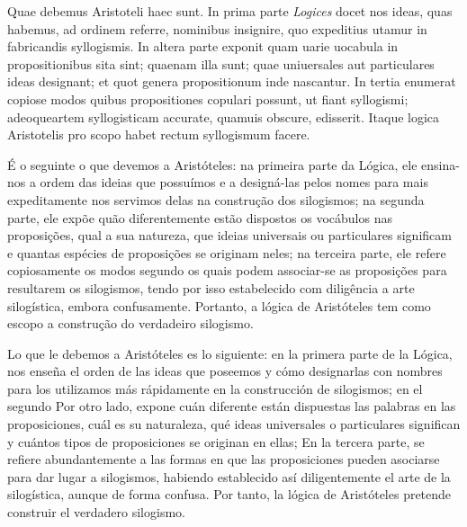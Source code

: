 \documentclass{article}
\begin{document}
\begin{paracol}{3}
\begin{nthcolumn}{2}
  \end{nthcolumn}
  \vspace{0.5cm}
  \begin{nthcolumn*}{0} %
    Quae debemus Aristoteli haec sunt. In prima parte \emph{Logices} docet nos ideas, quas habemus, ad ordinem referre, nominibus insignire, quo expeditius utamur in fabricandis syllogismis. In altera parte exponit quam uarie uocabula in propositionibus sita sint; quaenam illa sunt; quae uniuersales aut particulares ideas designant; et quot genera propositionum inde nascantur. In tertia enumerat copiose modos quibus propositiones copulari possunt, ut fiant syllogismi; adeoqueartem syllogisticam accurate, quamuis obscure, edisserit. Itaque logica Aristotelis pro scopo habet rectum syllogismum facere.
  \end{nthcolumn*}
  \vspace{0.5cm}
  \begin{nthcolumn}{1} %
    É o seguinte o que devemos a Aristóteles: na primeira parte da Lógica, ele ensina-nos a ordem das ideias que possuímos e a designá-las pelos nomes para mais expeditamente nos servimos delas na construção dos silogismos; na segunda parte, ele expõe quão diferentemente estão dispostos os vocábulos nas proposições, qual a sua natureza, que ideias universais ou particulares significam e quantas espécies de proposições se originam neles; na terceira parte, ele refere copiosamente os modos segundo os quais podem associar-se as proposições para resultarem os silogismos, tendo por isso estabelecido com diligência a arte silogística, embora confusamente. Portanto, a lógica de Aristóteles tem como escopo a construção do verdadeiro silogismo.
  \end{nthcolumn}
  \vspace{0.5cm}
  \begin{nthcolumn}{2} %
    Lo que le debemos a Aristóteles es lo siguiente: en la primera parte de la Lógica, nos enseña el orden de las ideas que poseemos y cómo designarlas con nombres para los utilizamos más rápidamente en la construcción de silogismos; en el segundo Por otro lado, expone cuán diferente están dispuestas las palabras en las proposiciones, cuál es su naturaleza, qué ideas universales o particulares significan y cuántos tipos de proposiciones se originan en ellas; En la tercera parte, se refiere abundantemente a las formas en que las proposiciones pueden asociarse para dar lugar a silogismos, habiendo establecido así diligentemente el arte de la silogística, aunque de forma confusa. Por tanto, la lógica de Aristóteles pretende construir el verdadero silogismo.

\end{nthcolumn}
\end{paracol}
\end{document}
